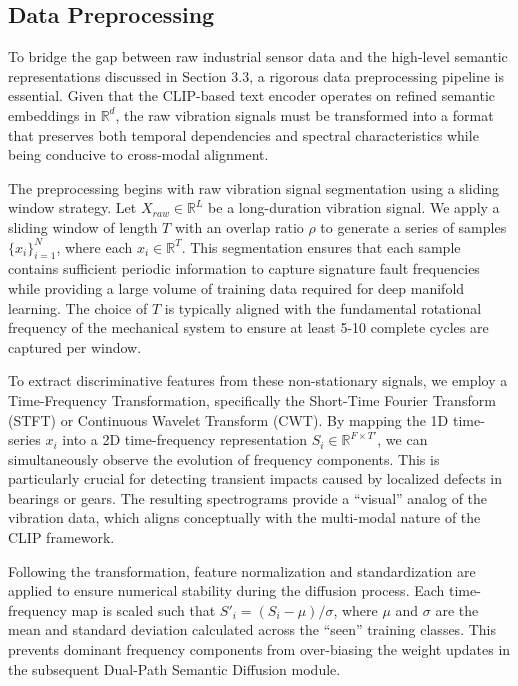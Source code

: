 \documentclass[journal]{IEEEtran}
\begin{document}
\subsection{Data Preprocessing}
To bridge the gap between raw industrial sensor data and the high-level semantic representations discussed in Section 3.3, a rigorous data preprocessing pipeline is essential. Given that the CLIP-based text encoder operates on refined semantic embeddings in $\mathbb{R}^d$, the raw vibration signals must be transformed into a format that preserves both temporal dependencies and spectral characteristics while being conducive to cross-modal alignment.

The preprocessing begins with raw vibration signal segmentation using a sliding window strategy. Let $X_{raw} \in \mathbb{R}^L$ be a long-duration vibration signal. We apply a sliding window of length $T$ with an overlap ratio $\rho$ to generate a series of samples $\{x_i\}_{i=1}^N$, where each $x_i \in \mathbb{R}^T$. This segmentation ensures that each sample contains sufficient periodic information to capture signature fault frequencies while providing a large volume of training data required for deep manifold learning. The choice of $T$ is typically aligned with the fundamental rotational frequency of the mechanical system to ensure at least 5-10 complete cycles are captured per window.

To extract discriminative features from these non-stationary signals, we employ a Time-Frequency Transformation, specifically the Short-Time Fourier Transform (STFT) or Continuous Wavelet Transform (CWT). By mapping the 1D time-series $x_i$ into a 2D time-frequency representation $S_i \in \mathbb{R}^{F \times T'}$, we can simultaneously observe the evolution of frequency components. This is particularly crucial for detecting transient impacts caused by localized defects in bearings or gears. The resulting spectrograms provide a ``visual'' analog of the vibration data, which aligns conceptually with the multi-modal nature of the CLIP framework.

Following the transformation, feature normalization and standardization are applied to ensure numerical stability during the diffusion process. Each time-frequency map is scaled such that $S'_i = (S_i - \mu) / \sigma$, where $\mu$ and $\sigma$ are the mean and standard deviation calculated across the ``seen'' training classes. This prevents dominant frequency components from over-biasing the weight updates in the subsequent Dual-Path Semantic Diffusion module.
\end{document}
